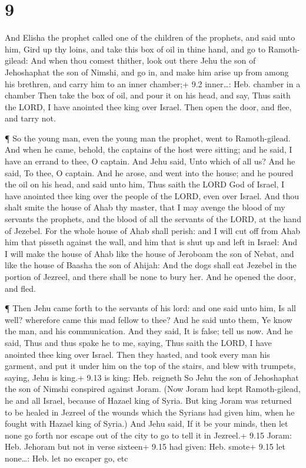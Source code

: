 \hypertarget{section-8}{%
\section{9}\label{section-8}}

 And Elisha the prophet called one of the children of the
prophets, and said unto him, Gird up thy loins, and take this box of oil
in thine hand, and go to Ramoth-gilead:  And when thou
comest thither, look out there Jehu the son of Jehoshaphat the son of
Nimshi, and go in, and make him arise up from among his brethren, and
carry him to an inner chamber;+ 9.2 inner\ldots: Heb. chamber in a
chamber  Then take the box of oil, and pour it on his head,
and say, Thus saith the LORD, I have anointed thee king over Israel.
Then open the door, and flee, and tarry not.

 ¶ So the young man, even the young man the prophet, went to
Ramoth-gilead.  And when he came, behold, the captains of
the host were sitting; and he said, I have an errand to thee, O captain.
And Jehu said, Unto which of all us? And he said, To thee, O captain.
 And he arose, and went into the house; and he poured the
oil on his head, and said unto him, Thus saith the LORD God of Israel, I
have anointed thee king over the people of the LORD, even over Israel.
 And thou shalt smite the house of Ahab thy master, that I
may avenge the blood of my servants the prophets, and the blood of all
the servants of the LORD, at the hand of Jezebel.  For the
whole house of Ahab shall perish: and I will cut off from Ahab him that
pisseth against the wall, and him that is shut up and left in Israel:
 And I will make the house of Ahab like the house of
Jeroboam the son of Nebat, and like the house of Baasha the son of
Ahijah:  And the dogs shall eat Jezebel in the portion of
Jezreel, and there shall be none to bury her. And he opened the door,
and fled.

 ¶ Then Jehu came forth to the servants of his lord: and
one said unto him, Is all well? wherefore came this mad fellow to thee?
And he said unto them, Ye know the man, and his communication.
 And they said, It is false; tell us now. And he said, Thus
and thus spake he to me, saying, Thus saith the LORD, I have anointed
thee king over Israel.  Then they hasted, and took every
man his garment, and put it under him on the top of the stairs, and blew
with trumpets, saying, Jehu is king.+ 9.13 is king: Heb. reigneth
 So Jehu the son of Jehoshaphat the son of Nimshi conspired
against Joram. (Now Joram had kept Ramoth-gilead, he and all Israel,
because of Hazael king of Syria.  But king Joram was
returned to be healed in Jezreel of the wounds which the Syrians had
given him, when he fought with Hazael king of Syria.) And Jehu said, If
it be your minds, then let none go forth nor escape out of the city to
go to tell it in Jezreel.+ 9.15 Joram: Heb. Jehoram but not in verse
sixteen+ 9.15 had given: Heb. smote+ 9.15 let none\ldots: Heb. let no
escaper go, etc

